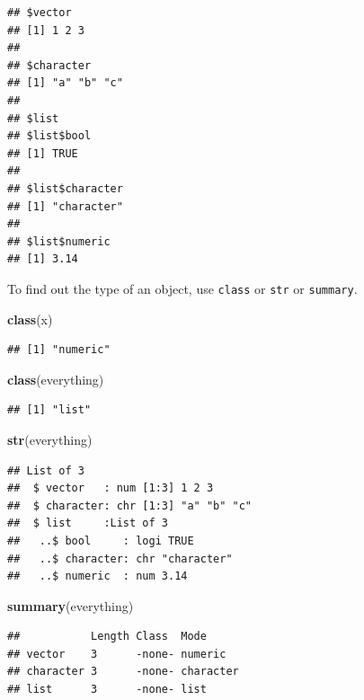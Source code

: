 \documentclass[]{book}
\newenvironment{Shaded}{\begin{snugshade}}{\end{snugshade}}
\newcommand{\KeywordTok}[1]{\textcolor[rgb]{0.13,0.29,0.53}{\textbf{#1}}}
\newcommand{\NormalTok}[1]{#1}
\begin{document}
\begin{verbatim}
## $vector
## [1] 1 2 3
## 
## $character
## [1] "a" "b" "c"
## 
## $list
## $list$bool
## [1] TRUE
## 
## $list$character
## [1] "character"
## 
## $list$numeric
## [1] 3.14
\end{verbatim}

To find out the type of an object, use \texttt{class} or \texttt{str} or \texttt{summary}.

\begin{Shaded}
\begin{Highlighting}[]
\KeywordTok{class}\NormalTok{(x)}
\end{Highlighting}
\end{Shaded}

\begin{verbatim}
## [1] "numeric"
\end{verbatim}

\begin{Shaded}
\begin{Highlighting}[]
\KeywordTok{class}\NormalTok{(everything)}
\end{Highlighting}
\end{Shaded}

\begin{verbatim}
## [1] "list"
\end{verbatim}

\begin{Shaded}
\begin{Highlighting}[]
\KeywordTok{str}\NormalTok{(everything)}
\end{Highlighting}
\end{Shaded}

\begin{verbatim}
## List of 3
##  $ vector   : num [1:3] 1 2 3
##  $ character: chr [1:3] "a" "b" "c"
##  $ list     :List of 3
##   ..$ bool     : logi TRUE
##   ..$ character: chr "character"
##   ..$ numeric  : num 3.14
\end{verbatim}

\begin{Shaded}
\begin{Highlighting}[]
\KeywordTok{summary}\NormalTok{(everything)}
\end{Highlighting}
\end{Shaded}

\begin{verbatim}
##           Length Class  Mode     
## vector    3      -none- numeric  
## character 3      -none- character
## list      3      -none- list
\end{verbatim}
\end{document}

